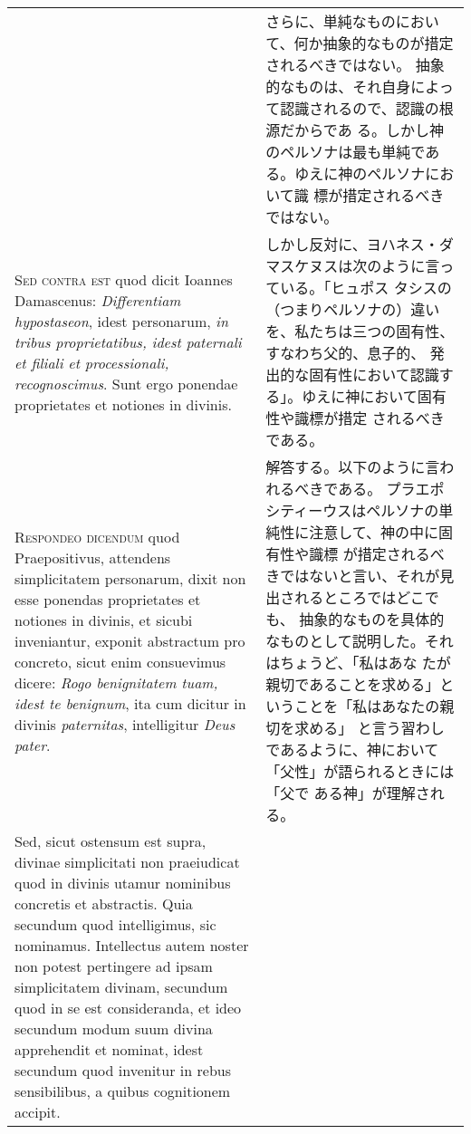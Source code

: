 \documentclass[10pt]{jsarticle} %
\begin{document}
\begin{longtable}{p{21em}p{21em}}
&

さらに、単純なものにおいて、何か抽象的なものが措定されるべきではない。
 抽象的なものは、それ自身によって認識されるので、認識の根源だからであ
 る。しかし神のペルソナは最も単純である。ゆえに神のペルソナにおいて識
 標が措定されるべきではない。


\\



{\scshape Sed contra est} quod dicit Ioannes Damascenus: {\itshape Differentiam
hypostaseon}, idest personarum, {\itshape in tribus proprietatibus, idest
paternali et filiali et processionali, recognoscimus}. Sunt ergo
ponendae proprietates et notiones in divinis.


&

しかし反対に、ヨハネス・ダマスケヌスは次のように言っている。「ヒュポス
 タシスの（つまりペルソナの）違いを、私たちは三つの固有性、すなわち父的、息子的、
 発出的な固有性において認識する」。ゆえに神において固有性や識標が措定
 されるべきである。


\\



{\scshape Respondeo dicendum} quod Praepositivus, attendens simplicitatem
personarum, dixit non esse ponendas proprietates et notiones in
divinis, et sicubi inveniantur, exponit abstractum pro concreto, sicut
enim consuevimus dicere: {\itshape Rogo benignitatem tuam, idest te benignum},
ita cum dicitur in divinis {\itshape paternitas}, intelligitur {\itshape Deus pater}. 

&

解答する。以下のように言われるべきである。
プラエポシティーウスはペルソナの単純性に注意して、神の中に固有性や識標
 が措定されるべきではないと言い、それが見出されるところではどこでも、
 抽象的なものを具体的なものとして説明した。それはちょうど、「私はあな
 たが親切であることを求める」ということを「私はあなたの親切を求める」
 と言う習わしであるように、神において「父性」が語られるときには「父で
 ある神」が理解される。


\\

Sed,
sicut ostensum est supra, divinae simplicitati non praeiudicat quod in
divinis utamur nominibus concretis et abstractis. Quia secundum quod
intelligimus, sic nominamus. Intellectus autem noster non potest
pertingere ad ipsam simplicitatem divinam, secundum quod in se est
consideranda, et ideo secundum modum suum divina apprehendit et
nominat, idest secundum quod invenitur in rebus sensibilibus, a quibus
cognitionem accipit. 


\end{longtable}
\end{document}
